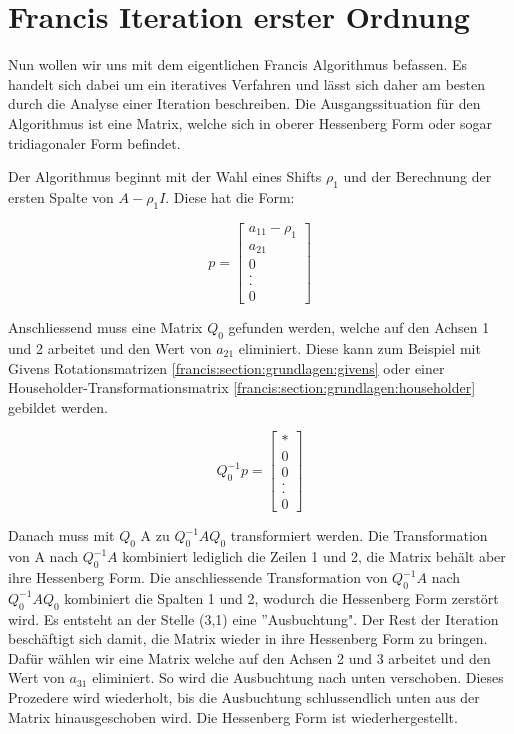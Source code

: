 \section{Francis Iteration erster Ordnung\label{francis:section:francis_iteration}}

Nun wollen wir uns mit dem eigentlichen Francis Algorithmus \cite{francis:watkins_book} befassen.
Es handelt sich dabei um ein iteratives Verfahren und lässt sich daher am besten durch die Analyse einer Iteration beschreiben.
Die Ausgangssituation für den Algorithmus ist eine Matrix, welche sich in oberer Hessenberg Form oder sogar tridiagonaler Form befindet.

Der Algorithmus beginnt mit der Wahl eines Shifts $\rho_{1}$ und der Berechnung der ersten Spalte von $A-\rho_{1} I$. 
Diese hat die Form:

\begin{equation}
	p=\begin{bmatrix}
	a_{11}-\rho_{1}\\
	a_{21}\\
	0\\
	.\\
	.\\
	0
	\end{bmatrix}
\end{equation}

Anschliessend muss eine Matrix $Q_{0}$ gefunden werden, welche auf den Achsen 1 und 2 arbeitet und den Wert von $a_{21}$ eliminiert. Diese kann zum Beispiel mit Givens Rotationsmatrizen \ref{francis:section:grundlagen:givens} oder einer Householder-Transformationsmatrix \ref{francis:section:grundlagen:householder} gebildet werden.

\begin{equation}
	Q_{0}^{-1}p=\begin{bmatrix}
	*\\
	0\\
	0\\
	.\\
	.\\
	0
	\end{bmatrix}
\end{equation}

Danach muss mit $Q_{0}$ A zu  $Q_{0}^{-1}AQ_{0}$ transformiert werden.
Die Transformation von A nach $Q_{0}^{-1}A$ kombiniert lediglich die Zeilen 1 und 2, die Matrix behält aber ihre Hessenberg Form.
Die anschliessende Transformation von $Q_{0}^{-1}A$ nach $Q_{0}^{-1}AQ_{0}$ kombiniert die Spalten 1 und 2, wodurch die Hessenberg Form zerstört wird.
Es entsteht an der Stelle (3,1) eine ''Ausbuchtung".
Der Rest der Iteration beschäftigt sich damit, die Matrix wieder in ihre Hessenberg Form zu bringen.
Dafür wählen wir eine Matrix welche auf den Achsen 2 und 3 arbeitet und den Wert von $a_{31}$ eliminiert.
So wird die Ausbuchtung nach unten verschoben.
Dieses Prozedere wird wiederholt, bis die Ausbuchtung schlussendlich unten aus der Matrix hinausgeschoben wird.
Die Hessenberg Form ist wiederhergestellt.


